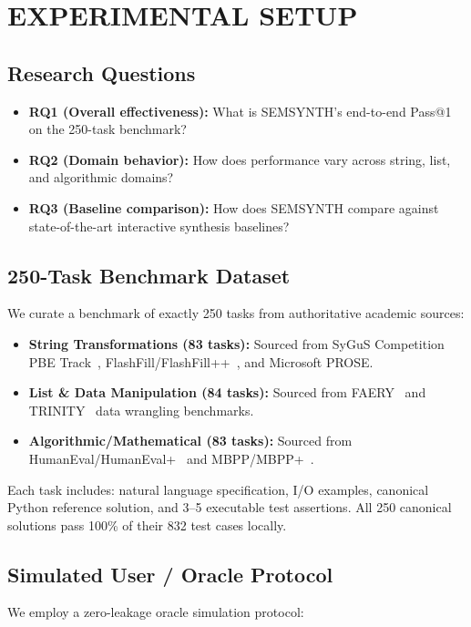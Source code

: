 \documentclass[10pt,conference]{IEEEtran}
\begin{document}
\section{EXPERIMENTAL SETUP}\label{sec:setup}

\subsection{Research Questions}
\begin{itemize}
  \item \textbf{RQ1 (Overall effectiveness):} What is SEMSYNTH's end-to-end Pass@1 on the 250-task benchmark?
  \item \textbf{RQ2 (Domain behavior):} How does performance vary across string, list, and algorithmic domains?
  \item \textbf{RQ3 (Baseline comparison):} How does SEMSYNTH compare against state-of-the-art interactive synthesis baselines?
\end{itemize}

\subsection{250-Task Benchmark Dataset}
We curate a benchmark of exactly 250 tasks from authoritative academic sources:
\begin{itemize}
  \item \textbf{String Transformations (83 tasks):} Sourced from SyGuS Competition PBE Track~\cite{sygus}, FlashFill/FlashFill++~\cite{flashfill, flashfillpp}, and Microsoft PROSE.
  \item \textbf{List \& Data Manipulation (84 tasks):} Sourced from FAERY~\cite{faery} and TRINITY~\cite{trinity} data wrangling benchmarks.
  \item \textbf{Algorithmic/Mathematical (83 tasks):} Sourced from HumanEval/HumanEval+~\cite{humaneval, humanevalplus} and MBPP/MBPP+~\cite{mbpp, mbppplus}.
\end{itemize}
Each task includes: natural language specification, I/O examples, canonical Python reference solution, and 3--5 executable test assertions. All 250 canonical solutions pass 100\% of their 832 test cases locally.

\subsection{Simulated User / Oracle Protocol}\label{sec:oracle}
We employ a zero-leakage oracle simulation protocol:
\end{document}
